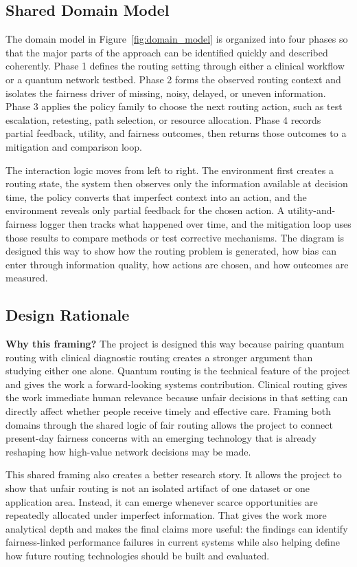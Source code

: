 \documentclass{IEEEtran}
\begin{document}
\subsection*{Shared Domain Model}
The domain model in Figure~\ref{fig:domain_model} is organized into four phases so that the major parts of the approach can be identified quickly and described coherently. Phase 1 defines the routing setting through either a clinical workflow or a quantum network testbed. Phase 2 forms the observed routing context and isolates the fairness driver of missing, noisy, delayed, or uneven information. Phase 3 applies the policy family to choose the next routing action, such as test escalation, retesting, path selection, or resource allocation. Phase 4 records partial feedback, utility, and fairness outcomes, then returns those outcomes to a mitigation and comparison loop.

The interaction logic moves from left to right. The environment first creates a routing state, the system then observes only the information available at decision time, the policy converts that imperfect context into an action, and the environment reveals only partial feedback for the chosen action. A utility-and-fairness logger then tracks what happened over time, and the mitigation loop uses those results to compare methods or test corrective mechanisms. The diagram is designed this way to show how the routing problem is generated, how bias can enter through information quality, how actions are chosen, and how outcomes are measured.

\subsection*{Design Rationale}
\noindent\textbf{Why this framing?} The project is designed this way because pairing quantum routing with clinical diagnostic routing creates a stronger argument than studying either one alone. Quantum routing is the technical feature of the project and gives the work a forward-looking systems contribution. Clinical routing gives the work immediate human relevance because unfair decisions in that setting can directly affect whether people receive timely and effective care. Framing both domains through the shared logic of fair routing allows the project to connect present-day fairness concerns with an emerging technology that is already reshaping how high-value network decisions may be made.

This shared framing also creates a better research story. It allows the project to show that unfair routing is not an isolated artifact of one dataset or one application area. Instead, it can emerge whenever scarce opportunities are repeatedly allocated under imperfect information. That gives the work more analytical depth and makes the final claims more useful: the findings can identify fairness-linked performance failures in current systems while also helping define how future routing technologies should be built and evaluated.
\end{document}
